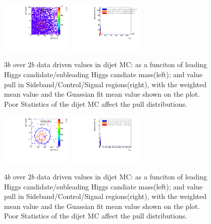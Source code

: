 \begin{figure}[htbp!]
\begin{center}
\includegraphics[width=0.31\textwidth,angle=-90]{figures/boosted/AppendixMuqcdstudy/QCD_ThreeTag_Incl_mH0H1.pdf}
\includegraphics[width=0.31\textwidth,angle=-90]{figures/boosted/AppendixMuqcdstudy/QCD_ThreeTag_Incl_mH0H1_pull.pdf}
\caption{$3b$ over $2b$ data driven \muqcd values in dijet MC: \muqcd as a funciton of leading Higgs candidate/subleading Higgs candiate mass(left); and \muqcd value pull in Sideband/Control/Signal regions(right), with the weighted mean value and the Guassian fit mean value shown on the plot. Poor Statistics of the dijet MC affect the pull distributions.}
\label{fig:app-muqcd-3b-qcd}
\end{center}
\end{figure}

\begin{figure}[htbp!]
\begin{center}
\includegraphics[width=0.31\textwidth,angle=-90]{figures/boosted/AppendixMuqcdstudy/QCD_FourTag_Incl_mH0H1.pdf}
\includegraphics[width=0.31\textwidth,angle=-90]{figures/boosted/AppendixMuqcdstudy/QCD_FourTag_Incl_mH0H1_pull.pdf}
\caption{$4b$ over $2b$ data driven \muqcd values in dijet MC: \muqcd as a funciton of leading Higgs candidate/subleading Higgs candiate mass(left); and \muqcd value pull in Sideband/Control/Signal regions(right), with the weighted mean value and the Guassian fit mean value shown on the plot. Poor Statistics of the dijet MC affect the pull distributions.}
\label{fig:app-muqcd-4b-qcd}
\end{center}
\end{figure}